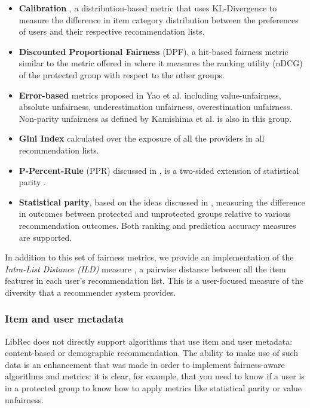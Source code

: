 \begin{itemize}
    \item \textbf{Calibration} \cite{steck2018calibrated}, a distribution-based metric that uses KL-Divergence to measure the difference in item category distribution between the preferences of users and their respective recommendation lists.
    \item \textbf{Discounted Proportional Fairness} (DPF), a hit-based fairness metric similar to the metric offered in \cite{castillo2019fairness} where it measures the ranking utility (nDCG) of the protected group with respect to the other groups. 
    \item \textbf{Error-based} metrics proposed in Yao et al. \cite{yao2017beyond} including value-unfairness, absolute unfairness, underestimation unfairness, overestimation unfairness. Non-parity unfairness as defined by Kamishima et al. \cite{kamishima2011fairness} is also in this group.
    \item \textbf{Gini Index} calculated over the exposure of all the providers in all recommendation lists. 
    \item \textbf{P-Percent-Rule} (PPR) discussed in \cite{biddle2006adverse}, is a two-sided extension of statistical parity \cite{barocas2016big}. 
    \item \textbf{Statistical parity}, based on the ideas discussed in \cite{zemel2013learning,ritov2017conditional}, measuring the difference in outcomes between protected and unprotected groups relative to various recommendation outcomes. Both ranking and prediction accuracy measures are supported.
\end{itemize}

In addition to this set of fairness metrics, we provide an implementation of the \textit{Intra-List Distance (ILD)} measure \cite{ziegler2005improving}, a pairwise distance between all the item features in each user’s recommendation list. This is a user-focused measure of the diversity that a recommender system provides. 

\subsubsection{Item and user metadata}
\label{subsubsec:libauto_item_user_features}
LibRec does not directly support algorithms that use item and user metadata: content-based or demographic recommendation. The ability to make use of such data is an enhancement that was made in order to implement fairness-aware algorithms and metrics: it is clear, for example, that you need to know if a user is in a protected group to know how to apply metrics like statistical parity or value unfairness. 

